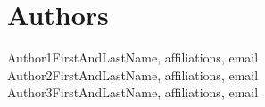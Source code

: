\documentclass[11pt, singlecolumn, citestyle=authoryear]{elegantbook}
\begin{document}
%

\newpage
\chapter*{Authors}
\begin{center}
Author1FirstAndLastName, affiliations, email\\Author2FirstAndLastName, affiliations, email\\
Author3FirstAndLastName, affiliations, email\\
\end{center}

\printbibliography[heading=bibintoc, title=\ebibname]
\end{document}
